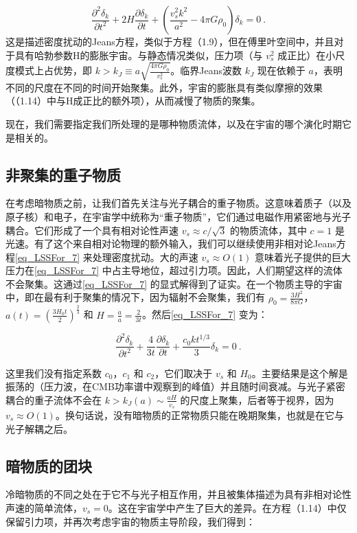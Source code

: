 \begin{equation}\label{eq_LSSFor_7} \frac{\partial^2 \delta_k}{\partial t^2} + 2H \frac{\partial \delta_k}{\partial t} + \left( \frac{v_s^2 k^2}{a^2} - 4\pi G\rho_0 \right) \delta_k = 0~. 
\end{equation}
这是描述密度扰动的Jeans方程，类似于方程（1.9），但在傅里叶空间中，并且对于具有哈勃参数H的膨胀宇宙。与静态情况类似，压力项（与 \( v_s^2 \) 成正比）在小尺度模式上占优势，即 \( k > k_J \equiv a \sqrt{\frac{4\pi G\rho_0}{v_s^2}} \)。临界Jeans波数 \( k_J \) 现在依赖于 \( a \)，表明不同的尺度在不同的时间开始聚集。此外，宇宙的膨胀具有类似摩擦的效果（（1.14）中与H成正比的额外项），从而减慢了物质的聚集。

现在，我们需要指定我们所处理的是哪种物质流体，以及在宇宙的哪个演化时期它是相关的。

\subsection{非聚集的重子物质}

在考虑暗物质之前，让我们首先关注与光子耦合的重子物质。这意味着质子（以及原子核）和电子，在宇宙学中统称为“重子物质”，它们通过电磁作用紧密地与光子耦合。它们形成了一个具有相对论性声速 \( v_s \approx c/\sqrt{3} \) 的物质流体，其中 \( c = 1 \) 是光速。有了这个来自相对论物理的额外输入，我们可以继续使用非相对论Jeans方程\autoref{eq_LSSFor_7} 来处理密度扰动。大的声速 \( v_s \approx O(1) \) 意味着光子提供的巨大压力在\autoref{eq_LSSFor_7} 中占主导地位，超过引力项。因此，人们期望这样的流体不会聚集。这通过\autoref{eq_LSSFor_7} 的显式解得到了证实。在一个物质主导的宇宙中，即在最有利于聚集的情况下，因为辐射不会聚集，我们有 \( \rho_0 = \frac{3H^2}{8\pi G} \)，\( a(t) = \left(\frac{3H_0 t}{2}\right)^{\frac{2}{3}} \) 和 \( H = \frac{\dot{a}}{a} = \frac{2}{3t} \)。然后\autoref{eq_LSSFor_7} 变为：

\[ \frac{\partial^2 \delta_k}{\partial t^2} + \frac{4}{3t} \frac{\partial \delta_k}{\partial t} + \frac{c_0 k t^{1/3}}{3} \delta_k = 0 ~. \]

这里我们没有指定系数 \( c_0 \)，\( c_1 \) 和 \( c_2 \)，它们取决于 \( v_s \) 和 \( H_0 \)。主要结果是这个解是振荡的（压力波，在CMB功率谱中观察到的峰值）并且随时间衰减。与光子紧密耦合的重子流体不会在 \( k > k_J(a) \sim \frac{aH}{v_s} \) 的尺度上聚集，后者等于视界，因为 \( v_s \approx O(1) \)。换句话说，没有暗物质的正常物质只能在晚期聚集，也就是在它与光子解耦之后。

\subsection{暗物质的团块}
冷暗物质的不同之处在于它不与光子相互作用，并且被集体描述为具有非相对论性声速的简单流体，\( v_s = 0 \)。这在宇宙学中产生了巨大的差异。在方程（1.14）中仅保留引力项，并再次考虑宇宙的物质主导阶段，我们得到：

